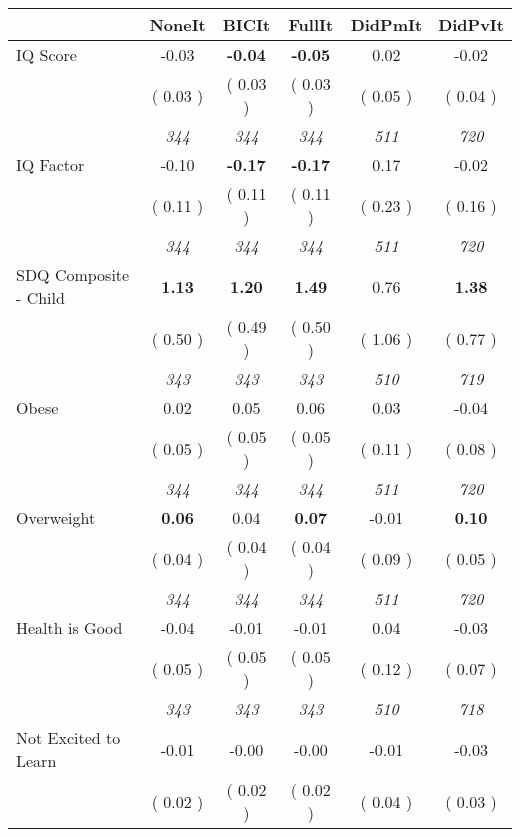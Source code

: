 \begin{tabular}{l c c c c c}
\toprule
 & NoneIt & BICIt & FullIt & DidPmIt & DidPvIt \\
\midrule
IQ Score &     -0.03 & \textbf{     -0.04 } & \textbf{     -0.05 } &      0.02 &     -0.02 \\
& (     0.03 ) & (     0.03 ) & (     0.03 ) & (     0.05 ) & (     0.04 ) \\
& \textit{ 344 } & \textit{ 344 } & \textit{ 344 } & \textit{ 511 } & \textit{ 720 } \\
IQ Factor &     -0.10 & \textbf{     -0.17 } & \textbf{     -0.17 } &      0.17 &     -0.02 \\
& (     0.11 ) & (     0.11 ) & (     0.11 ) & (     0.23 ) & (     0.16 ) \\
& \textit{ 344 } & \textit{ 344 } & \textit{ 344 } & \textit{ 511 } & \textit{ 720 } \\
SDQ Composite - Child & \textbf{      1.13 } & \textbf{      1.20 } & \textbf{      1.49 } &      0.76 & \textbf{      1.38 } \\
& (     0.50 ) & (     0.49 ) & (     0.50 ) & (     1.06 ) & (     0.77 ) \\
& \textit{ 343 } & \textit{ 343 } & \textit{ 343 } & \textit{ 510 } & \textit{ 719 } \\
Obese &      0.02 &      0.05 &      0.06 &      0.03 &     -0.04 \\
& (     0.05 ) & (     0.05 ) & (     0.05 ) & (     0.11 ) & (     0.08 ) \\
& \textit{ 344 } & \textit{ 344 } & \textit{ 344 } & \textit{ 511 } & \textit{ 720 } \\
Overweight & \textbf{      0.06 } &      0.04 & \textbf{      0.07 } &     -0.01 & \textbf{      0.10 } \\
& (     0.04 ) & (     0.04 ) & (     0.04 ) & (     0.09 ) & (     0.05 ) \\
& \textit{ 344 } & \textit{ 344 } & \textit{ 344 } & \textit{ 511 } & \textit{ 720 } \\
Health is Good &     -0.04 &     -0.01 &     -0.01 &      0.04 &     -0.03 \\
& (     0.05 ) & (     0.05 ) & (     0.05 ) & (     0.12 ) & (     0.07 ) \\
& \textit{ 343 } & \textit{ 343 } & \textit{ 343 } & \textit{ 510 } & \textit{ 718 } \\
Not Excited to Learn &     -0.01 &     -0.00 &     -0.00 &     -0.01 &     -0.03 \\
& (     0.02 ) & (     0.02 ) & (     0.02 ) & (     0.04 ) & (     0.03 ) \\

\end{tabular}
